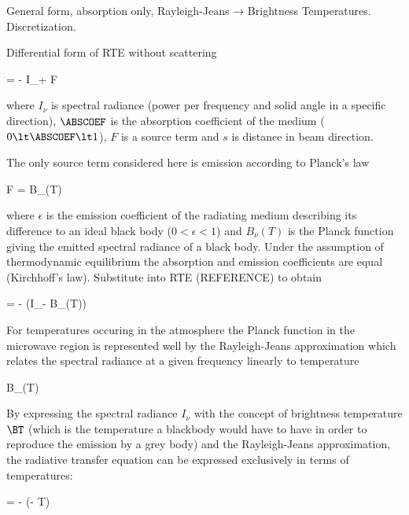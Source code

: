 \startsection[title=The Radiative Transfer Equation]

    General form, absorption only, Rayleigh-Jeans → Brightness Temperatures.
    Discretization.

    Differential form of RTE without scattering

    \startformula
         = - I_\nu \ABSCOEF + F \EQCOMMA
    \stopformula

    where $I_\nu$ is spectral radiance (power per frequency and solid angle in
    a specific direction), $\ABSCOEF$ is the absorption coefficient of the medium
    ($0 \lt \ABSCOEF \lt 1$), $F$ is a source term and $s$ is distance in beam
    direction.

    The only source term considered here is emission according to Planck's law

    \startformula
        F = \epsilon B_\nu(T) \EQCOMMA
    \stopformula

    where $\epsilon$ is the emission coefficient of the radiating medium
    describing its difference to an ideal black body ($0 \lt \epsilon \lt 1$)
    and $B_\nu(T)$ is the Planck function giving the emitted spectral radiance
    of a black body. Under the assumption of thermodynamic equilibrium the
    absorption and emission coefficients are equal (Kirchhoff's law).
    Substitute into RTE (REFERENCE) to obtain

    \startformula
         = - \ABSCOEF(I_\nu - B_\nu(T)) \EQSTOP
    \stopformula

    For temperatures occuring in the atmosphere the Planck function in the
    microwave region is represented well by the Rayleigh-Jeans approximation
    which relates the spectral radiance at a given frequency linearly to
    temperature

    \startformula
        B_\nu(T) \approx {} \EQSTOP
    \stopformula

    By expressing the spectral radiance $I_\nu$ with the concept of brightness
    temperature $\BT$ (which is the temperature a blackbody would have to have
    in order to reproduce the emission by a grey body) and the Rayleigh-Jeans
    approximation, the radiative transfer equation can be expressed exclusively
    in terms of temperatures:

    \startformula
         = - \ABSCOEF (\BT - T) \EQSTOP
    \stopformula

    \startsubsection[title={A Solution for Ground-based Radiometer Applications}]

